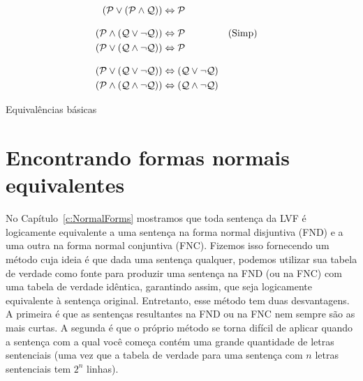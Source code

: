 \begin{table}
{\begin{align*}
(\mathcal{P} \lor (\mathcal{P} \land \mathcal{Q})) & \Leftrightarrow \mathcal{P}\\[2ex]
(\mathcal{P} \land (\mathcal{Q} \lor \lnot\mathcal{Q})) & \Leftrightarrow \mathcal{P}  && \text{(Simp)}\\
(\mathcal{P} \lor (\mathcal{Q} \land \lnot\mathcal{Q})) & \Leftrightarrow \mathcal{P}\\[2ex]
(\mathcal{P} \lor (\mathcal{Q} \lor \lnot\mathcal{Q})) & \Leftrightarrow (\mathcal{Q} \lor \lnot\mathcal{Q}) \\
(\mathcal{P} \land (\mathcal{Q} \land \lnot\mathcal{Q})) & \Leftrightarrow (\mathcal{Q} \land \lnot\mathcal{Q})
\end{align*}  }
\caption{Equivalências básicas}
\label{tab:equivalences}
\end{table}


\section{Encontrando formas normais equivalentes}

No Capítulo~\ref{c:NormalForms} mostramos que toda sentença da LVF é logicamente equivalente a uma sentença na forma normal disjuntiva (FND) e a uma outra na forma normal conjuntiva (FNC). 
Fizemos isso fornecendo um método cuja ideia é que dada uma sentença qualquer, podemos utilizar sua tabela de verdade como fonte para produzir uma sentença na FND (ou na FNC) com uma tabela de verdade idêntica, garantindo assim, que seja logicamente equivalente à sentença original.
Entretanto, esse método tem duas desvantagens. A primeira é que as sentenças resultantes na FND ou na FNC nem sempre são as mais curtas. A segunda é que o próprio método se torna difícil de aplicar quando a sentença com a qual você começa contém uma grande quantidade de letras sentenciais (uma vez que a tabela de verdade para uma sentença com $n$ letras sentenciais tem $2^n$ linhas).


